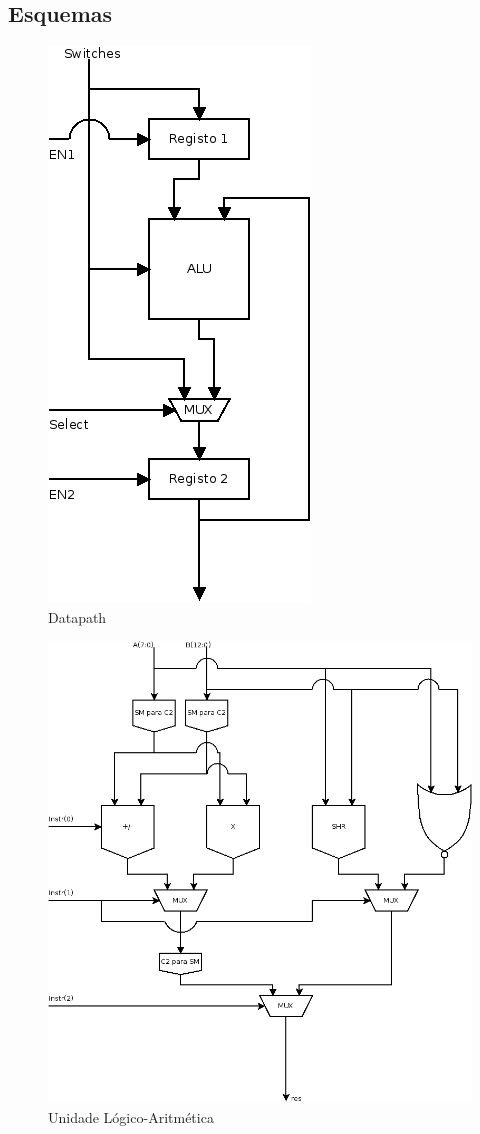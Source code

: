 \documentclass[a4paper]{article}
\begin{document}
\subsection{Esquemas}
\begin{figure}[H]
	\centering
	\includegraphics[scale=0.28]{DP}
	\caption{Datapath}
	\label{fig:DPdiagram}
\end{figure}
\begin{figure}[H]
	\centering
	\includegraphics[scale=0.28]{ALU}
	\caption{Unidade Lógico-Aritmética}
	\label{fig:ALUdiagram}
\end{figure}
\pagebreak
\end{document}
